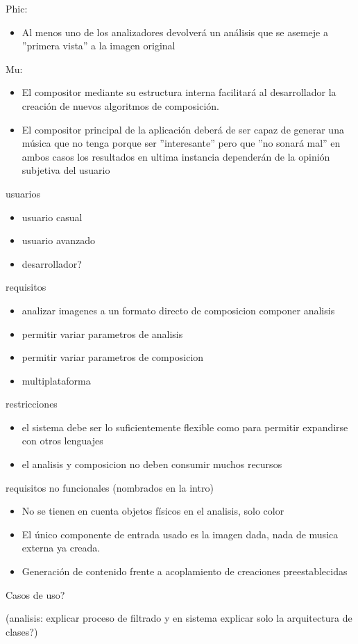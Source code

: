 Phic:
\begin{itemize}
	\item Al menos uno de los analizadores devolverá un análisis que se asemeje a ''primera vista'' a la imagen original
\end{itemize}
Mu:
\begin{itemize}
	\item El compositor mediante su estructura interna facilitará al desarrollador la creación de nuevos algoritmos de composición.
	\item El compositor principal de la aplicación deberá de ser capaz de generar una música que no tenga porque ser ''interesante'' pero que ''no sonará mal'' en ambos casos los resultados en ultima instancia dependerán de la opinión subjetiva del usuario
\end{itemize}

	usuarios\\
	\begin{itemize}
		\item usuario casual
		\item usuario avanzado
		\item desarrollador?\\
	\end{itemize}

	requisitos\\
	\begin{itemize}
		\item analizar imagenes a un formato directo de composicion
		componer analisis
		\item permitir variar parametros de analisis
		\item permitir variar parametros de composicion
		\item multiplataforma\\
	\end{itemize}
		
		
	restricciones\\
	\begin{itemize}
		\item el sistema debe ser lo suficientemente flexible como para permitir expandirse con otros lenguajes
		\item el analisis y composicion no deben consumir muchos recursos\\
	\end{itemize}
		
	requisitos no funcionales (nombrados en la intro)\\
	\begin{itemize}	
		\item No se tienen en cuenta objetos físicos en el analisis, solo color
		\item El único componente de entrada usado es la imagen dada, nada de musica externa ya creada.
		\item Generación de contenido frente a acoplamiento de creaciones preestablecidas	\\	
	\end{itemize}		
		
		
Casos de uso?

	(analisis: explicar proceso de filtrado y en sistema explicar solo la arquitectura de clases?)

